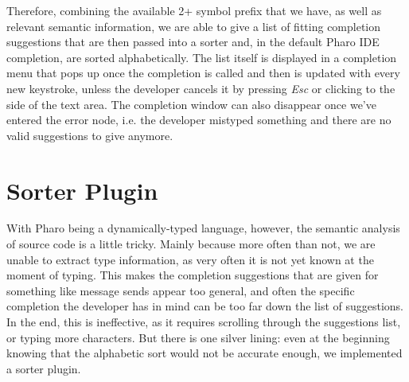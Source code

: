Therefore, combining the available 2+ symbol prefix that we have, as well as relevant semantic information, we are able to give a list of fitting completion suggestions that are then passed into a sorter and, in the default Pharo IDE completion, are sorted alphabetically. The list itself is displayed in a completion menu that pops up once the completion is called and then is updated with every new keystroke, unless the developer cancels it by pressing \textit{Esc} or clicking to the side of the text area. The completion window can also disappear once we've entered the error node, i.e. the developer mistyped something and there are no valid suggestions to give anymore.

\section{Sorter Plugin}
With Pharo being a dynamically-typed language, however, the semantic analysis of source code is a little tricky. Mainly because more often than not, we are unable to extract type information, as very often it is not yet known at the moment of typing. This makes the completion suggestions that are given for something like message sends appear too general, and often the specific completion the developer has in mind can be too far down the list of suggestions. In the end, this is ineffective, as it requires scrolling through the suggestions list, or typing more characters. But there is one silver lining: even at the beginning knowing that the alphabetic sort would not be accurate enough, we implemented a sorter plugin.